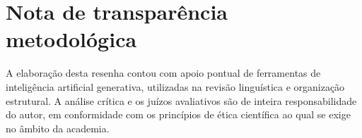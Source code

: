\documentclass[portuguese]{textolivre}
\begin{document}
\vspace{-2pt}
\vspace{-1em}
\section*{\fontsize{9}{12}\selectfont Nota de transparência metodológica}
A elaboração desta resenha contou com apoio pontual de ferramentas de inteligência artificial generativa, utilizadas na revisão linguística e organização estrutural. A análise crítica e os juízos avaliativos são de inteira responsabilidade do autor, em conformidade com os princípios de ética científica ao qual se exige no âmbito da academia.

\vspace{-2pt}
\begin{dataavailability}
\end{dataavailability}
\end{document}
